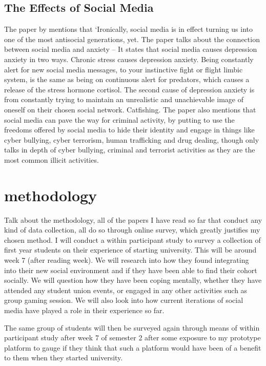 \documentclass[lettersize,journal]{IEEEtran}
\begin{document}
\subsection{The Effects of Social Media}
    The paper by \cite{Amedie 2015} mentions that ‘Ironically, social media is in
    effect turning us into one of the most antisocial generations, yet. The paper
    talks about the connection between social media and anxiety – It states that
    social media causes depression anxiety in two ways. Chronic stress causes
    depression anxiety. Being constantly alert for new social media messages, to your
    instinctive fight or flight limbic system, is the same as being on continuous alert
    for predators, which causes a release of the stress hormone cortisol. The second cause
    of depression anxiety is from constantly trying to maintain an unrealistic and
    unachievable image of oneself on their chosen social network. Catfishing. The
    paper also mentions that social media can pave the way for criminal activity, by
    putting to use the freedoms offered by social media to hide their identity and engage
    in things like cyber bullying, cyber terrorism, human trafficking and drug dealing,
    though only talks in depth of cyber bullying, criminal and terrorist activities as
    they are the most common illicit activities.
\section{methodology}
    Talk about the methodology, all of the papers I have read so far that conduct
    any kind of data collection, all do so through online survey, which greatly
    justifies my chosen method. I will conduct a within participant study to survey
    a collection of first year students on their experience of starting university.
    This will be around week 7 (after reading week). We will research into how they
    found integrating into their new social environment and if they have been able to
    find their cohort socially. We will question how they have been coping mentally,
    whether they have attended any student union events, or engaged in any other
    activities such as group gaming session. We will also look into how current
    iterations of social media have played a role in their experience so far.

    The same group of students will then be surveyed again through means of within
    participant study after week 7 of semester 2 after some exposure to my prototype
    platform to gauge if they think that such a platform would have been of a benefit
    to them when they started university.
\end{document}
